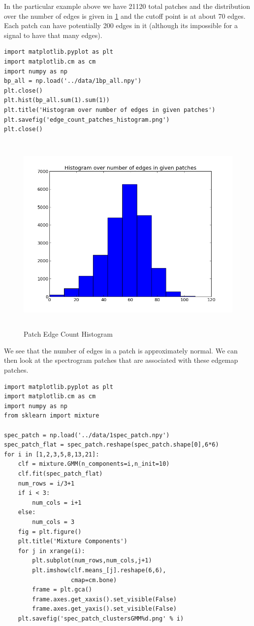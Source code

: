 \documentclass[11pt]{article}
\begin{document}
In the particular example above we have 21120 total patches and the
distribution over the number of edges is given in
\ref{fig:edge_count_histogram} and the cutoff point is at about 70
edges.  Each patch can have potentially 200 edges in it (although its
impossible for a signal to have that many edges).


\begin{verbatim}
import matplotlib.pyplot as plt
import matplotlib.cm as cm
import numpy as np
bp_all = np.load('../data/1bp_all.npy')
plt.close()
plt.hist(bp_all.sum(1).sum(1))
plt.title('Histogram over number of edges in given patches')
plt.savefig('edge_count_patches_histogram.png')
plt.close()
\end{verbatim}


\begin{figure}[htb]
\centering
\includegraphics[height=10cm]{./edge_count_patches_histogram.png}
\caption{\label{fig:edge_count_histogram}Patch Edge Count Histogram}
\end{figure}

We see that the number of edges in a patch is approximately normal.
We can then look at the spectrogram patches that are associated with these
edgemap patches.  


\begin{verbatim}
import matplotlib.pyplot as plt
import matplotlib.cm as cm
import numpy as np
from sklearn import mixture

spec_patch = np.load('../data/1spec_patch.npy')
spec_patch_flat = spec_patch.reshape(spec_patch.shape[0],6*6)
for i in [1,2,3,5,8,13,21]:
    clf = mixture.GMM(n_components=i,n_init=10)
    clf.fit(spec_patch_flat)
    num_rows = i/3+1
    if i < 3:
        num_cols = i+1
    else:
        num_cols = 3
    fig = plt.figure()
    plt.title('Mixture Components')
    for j in xrange(i):
        plt.subplot(num_rows,num_cols,j+1)
        plt.imshow(clf.means_[j].reshape(6,6),
                   cmap=cm.bone)
        frame = plt.gca()
        frame.axes.get_xaxis().set_visible(False)
        frame.axes.get_yaxis().set_visible(False)
    plt.savefig('spec_patch_clustersGMM%d.png' % i)
\end{verbatim}
\end{document}
